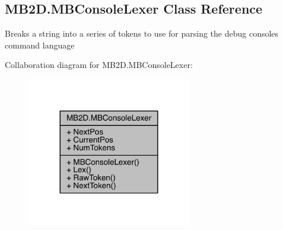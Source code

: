 \hypertarget{class_m_b2_d_1_1_m_b_console_lexer}{}\subsection{M\+B2\+D.\+M\+B\+Console\+Lexer Class Reference}
\label{class_m_b2_d_1_1_m_b_console_lexer}


Breaks a string into a series of tokens to use for parsing the debug consoles command language  




Collaboration diagram for M\+B2\+D.\+M\+B\+Console\+Lexer\+:
\nopagebreak
\begin{figure}[H]
\begin{center}
\leavevmode
\includegraphics[width=203pt]{class_m_b2_d_1_1_m_b_console_lexer__coll__graph}
\end{center}
\end{figure}
